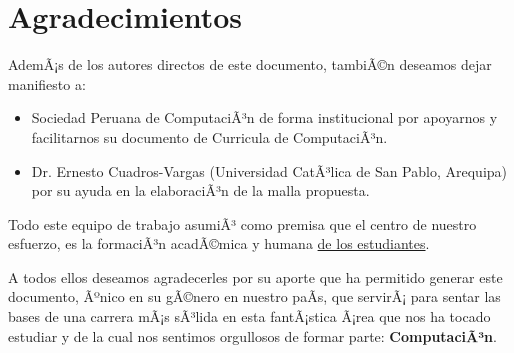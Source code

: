 \chapter*{Agradecimientos}\label{chap:cs-ack}
%

AdemÃ¡s de los autores directos de este documento, tambiÃ©n deseamos dejar manifiesto a:

\begin{itemize}
\item Sociedad Peruana de ComputaciÃ³n de forma institucional por apoyarnos y facilitarnos su documento de Curricula de ComputaciÃ³n.

\item Dr. Ernesto Cuadros-Vargas (Universidad CatÃ³lica de San Pablo, Arequipa) por su ayuda en la elaboraciÃ³n de la malla propuesta. 
\end{itemize}

Todo este equipo de trabajo asumiÃ³ como premisa que el centro de nuestro esfuerzo,
es la formaciÃ³n acadÃ©mica y humana \underline{de los estudiantes}.

A todos ellos deseamos agradecerles por su aporte que ha permitido generar 
este documento, Ãºnico en su gÃ©nero en nuestro paÃ­s, que servirÃ¡ para sentar las 
bases de una carrera mÃ¡s sÃ³lida en esta fantÃ¡stica Ã¡rea que nos ha tocado estudiar y 
de la cual nos sentimos orgullosos de formar parte: \textbf{ComputaciÃ³n}.
